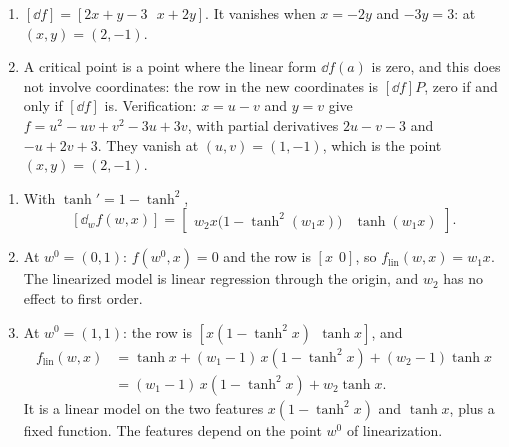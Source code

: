 \begin{enumerate}[nosep]
  \item $[\dd f] = [2x + y - 3\ \ \ x + 2y]$. It vanishes when
        $x = -2y$ and $-3y = 3$: at $(x, y) = (2, -1)$.
  \item A critical point is a point where the linear form $\dd f(a)$ is
        zero, and this does not involve coordinates: the row in the new
        coordinates is $[\dd f]P$, zero if and only if $[\dd f]$ is.
        Verification: $x = u - v$ and $y = v$ give
        $f = u^2 - uv + v^2 - 3u + 3v$, with partial derivatives
        $2u - v - 3$ and $-u + 2v + 3$. They vanish at
        $(u, v) = (1, -1)$, which is the point $(x, y) = (2, -1)$.
\end{enumerate}

\begin{enumerate}[nosep]
  \item With $\tanh' = 1 - \tanh^2$,
        \[
          [\dd_wf(w, x)]
          = \begin{bmatrix}w_2x\bigl(1 - \tanh^2(w_1x)\bigr)
            & \tanh(w_1x)\end{bmatrix} .
        \]
  \item At $w^0 = (0, 1)$: $f(w^0, x) = 0$ and the row is $[x\ \ 0]$, so
        $f_{\mathrm{lin}}(w, x) = w_1x$. The linearized model is linear
        regression through the origin, and $w_2$ has no effect to first
        order.
  \item At $w^0 = (1, 1)$: the row is
        $[x(1 - \tanh^2x)\ \ \tanh x]$, and
        \begin{align*}
          f_{\mathrm{lin}}(w, x)
          &= \tanh x + (w_1 - 1)\,x(1 - \tanh^2x) + (w_2 - 1)\tanh x\\
          &= (w_1 - 1)\,x(1 - \tanh^2x) + w_2\tanh x .
        \end{align*}
        It is a linear model on the two features $x(1 - \tanh^2x)$ and
        $\tanh x$, plus a fixed function. The features depend on the
        point $w^0$ of linearization.
\end{enumerate}

\section{}

